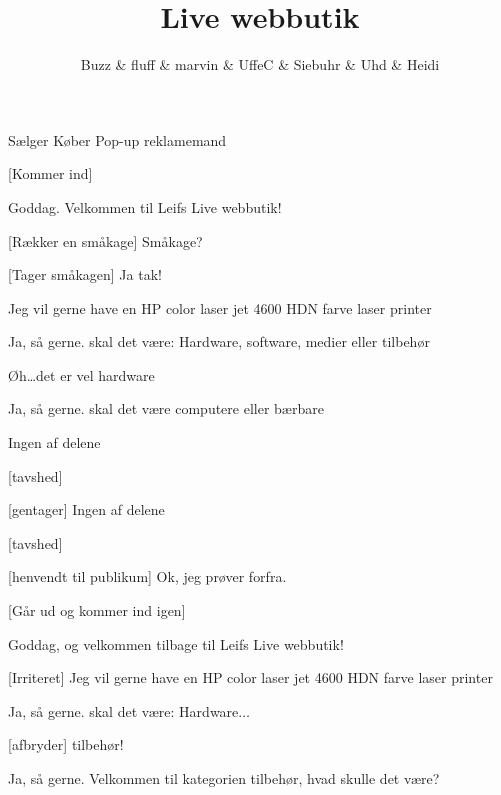 \documentclass[a4paper,11pt]{article}
\title{Live webbutik}
\author{Buzz \& fluff \& marvin \& UffeC \& Siebuhr \& Uhd \& Heidi}
\begin{document}
\maketitle

\begin{roles}
   Sælger 
   Køber
   Pop-up reklamemand
\end{roles}

\begin{props}
\end{props}



\begin{sketch}

[Kommer ind]

 Goddag. Velkommen til Leifs Live webbutik!

[Rækker en småkage] Småkage?

[Tager småkagen] Ja tak!


 Jeg vil gerne have en HP color laser jet 4600 HDN farve laser printer

 Ja, så gerne. skal det være: Hardware, software, medier eller tilbehør

 Øh\ldots det er vel hardware

 Ja, så gerne. skal det være computere eller bærbare

 Ingen af delene

[tavshed]

[gentager] Ingen af delene

[tavshed]

[henvendt til publikum] Ok, jeg prøver forfra.

[Går ud og kommer ind igen]

 Goddag, og velkommen tilbage til Leifs Live webbutik!


[Irriteret] Jeg vil gerne have en HP color laser jet 4600 HDN farve laser printer

 Ja, så gerne. skal det være: Hardware$\ldots$

[afbryder] tilbehør!

 Ja, så gerne. Velkommen til kategorien tilbehør, hvad skulle det være?


\end{sketch}
\end{document}
